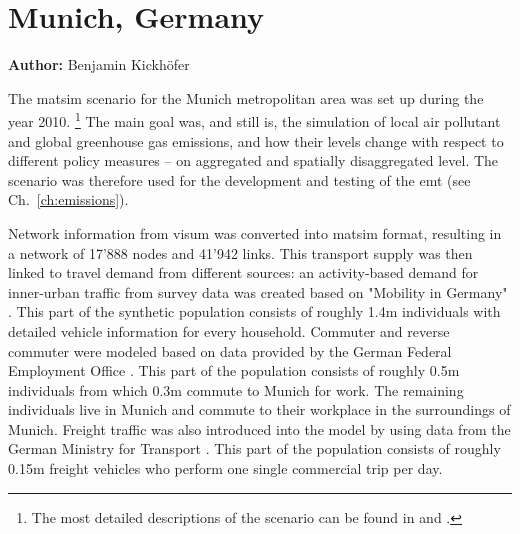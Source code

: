 \section{Munich, Germany}
\label{ch:scenarios:munich}
\hfill \textbf{Author:} Benjamin Kickh\"ofer

The \acrshort{matsim} scenario for the Munich metropolitan area was set up during the year 2010.%
%
\footnote{
%
The most detailed descriptions of the scenario can be found in \citet{KickhoeferEtAl_VanoutriveVerhetsel_2013} and \citet{Kickhoefer_PhDThesis_2014}.
%
}
%
The main goal was, and still is, the simulation of local air pollutant and global greenhouse gas emissions, and how their levels change with respect to different policy measures -- on aggregated and spatially disaggregated level. The scenario was therefore used for the development and testing of the \gls{emt} (see Ch.~\ref{ch:emissions}).

Network information from \acrshort{visum} was converted into \acrshort{matsim} format, resulting in a network of 17'888 nodes and 41'942 links.
%
This transport supply was then linked to travel demand from different sources: an activity-based demand for inner-urban traffic from survey data was created based on "Mobility in Germany" \citep[MiD 2002,][]{FollmerEtAl_TechRep_infasDIW_2004}. This part of the synthetic population consists of roughly 1.4m individuals with detailed vehicle information for every household.
%
Commuter and reverse commuter were modeled based on data provided by the German Federal Employment Office \citep{BoehmeEigenhueller_TechRep_IAB_2006}. This part of the population consists of roughly 0.5m individuals from which 0.3m commute to Munich for work. The remaining individuals live in Munich and commute to their workplace in the surroundings of Munich.
%
Freight traffic was also introduced into the model by using data from the German Ministry for Transport \citep{ITBBVU_TechRep_2007}. This part of the population consists of roughly 0.15m freight vehicles who perform one single commercial trip per day.

